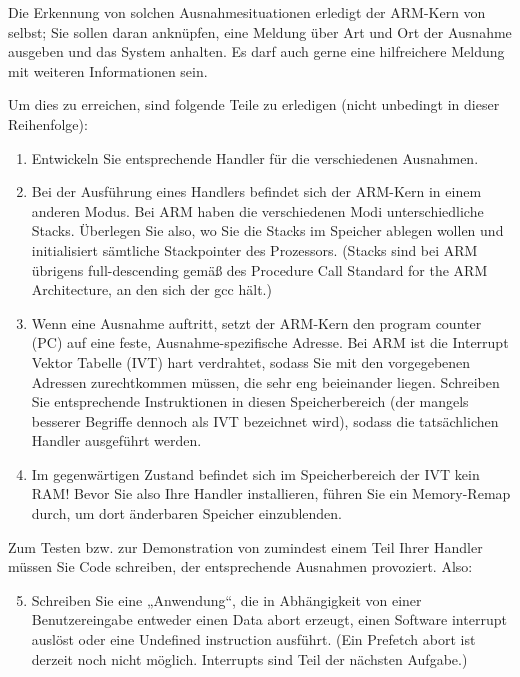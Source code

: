 \begin{description}
Die Erkennung von solchen Ausnahmesituationen erledigt der ARM-Kern von selbst; Sie sollen
daran anknüpfen, eine Meldung über Art und Ort der Ausnahme ausgeben und das System
anhalten. Es darf auch gerne eine hilfreichere Meldung mit weiteren Informationen sein.

Um dies zu erreichen, sind folgende Teile zu erledigen (nicht unbedingt in dieser Reihenfolge):
\begin{enumerate}
	\item Entwickeln Sie entsprechende Handler für die verschiedenen Ausnahmen.
	\item Bei der Ausführung eines Handlers befindet sich der ARM-Kern in einem anderen Modus. Bei ARM haben die verschiedenen Modi unterschiedliche Stacks. Überlegen Sie also, wo Sie die Stacks im Speicher ablegen wollen und initialisiert sämtliche Stackpointer des Prozessors. (Stacks sind bei ARM übrigens full-descending gemäß des Procedure Call Standard for the ARM Architecture, an den sich der gcc hält.)
	\item Wenn eine Ausnahme auftritt, setzt der ARM-Kern den program counter (PC) auf eine feste, Ausnahme-spezifische Adresse. Bei ARM ist die Interrupt Vektor Tabelle (IVT) hart verdrahtet, sodass Sie mit den vorgegebenen Adressen zurechtkommen müssen, die sehr eng beieinander liegen. Schreiben Sie entsprechende Instruktionen in diesen Speicherbereich (der mangels besserer Begriffe dennoch als IVT bezeichnet wird), sodass die tatsächlichen Handler ausgeführt werden.
	\item Im gegenwärtigen Zustand befindet sich im Speicherbereich der IVT kein RAM! Bevor Sie also Ihre Handler installieren, führen Sie ein Memory-Remap durch, um dort änderbaren Speicher einzublenden.\end{enumerate}
Zum Testen bzw. zur Demonstration von zumindest einem Teil Ihrer Handler müssen Sie Code schreiben, der entsprechende Ausnahmen provoziert. Also:
\begin{enumerate}
	\setcounter{enumi}{4}
	\item Schreiben Sie eine „Anwendung“, die in Abhängigkeit von einer Benutzereingabe entweder einen Data abort erzeugt, einen Software interrupt auslöst oder eine Undefined instruction ausführt. (Ein Prefetch abort ist derzeit noch nicht möglich. Interrupts sind Teil der nächsten Aufgabe.)
\end{enumerate}


\end{description}
